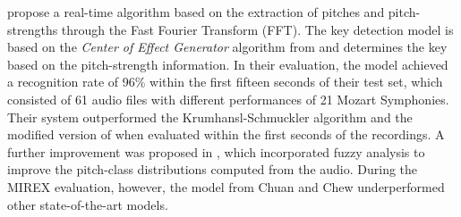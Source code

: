 \textcite{chuan2005polyphonic} propose a real-time algorithm
based on the extraction of pitches and pitch-strengths
through the Fast Fourier Transform (FFT). The key detection
model is based on the \emph{Center of Effect Generator}
algorithm from \textcite{chew2002spiral} and determines the
key based on the pitch-strength information. In their
evaluation, the model achieved a recognition rate of 96\%
within the first fifteen seconds of their test set, which
consisted of 61 audio files with different performances of
21 Mozart Symphonies. Their system outperformed the
Krumhansl-Schmuckler algorithm
\parencite{krumhansl1990cognitive} and the modified version
of \textcite{temperley1999whats} when evaluated within the
first seconds of the recordings. A further improvement was
proposed in \textcite{chuan2005fuzzy}, which incorporated
fuzzy analysis to improve the pitch-class distributions
computed from the audio. During the MIREX evaluation,
however, the model from Chuan and Chew underperformed other
state-of-the-art models.




